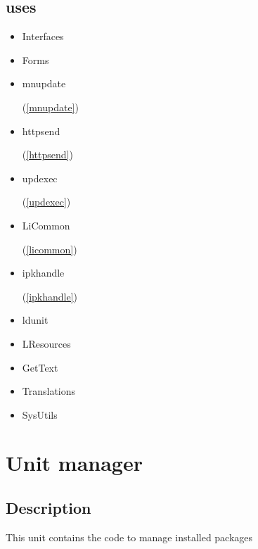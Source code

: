 \documentclass{report}
\begin{document}
\section{uses}
\begin{itemize}
\item \begin{ttfamily}Interfaces\end{ttfamily}\item \begin{ttfamily}Forms\end{ttfamily}\item \begin{ttfamily}mnupdate\end{ttfamily}(\ref{mnupdate})\item \begin{ttfamily}httpsend\end{ttfamily}(\ref{httpsend})\item \begin{ttfamily}updexec\end{ttfamily}(\ref{updexec})\item \begin{ttfamily}LiCommon\end{ttfamily}(\ref{licommon})\item \begin{ttfamily}ipkhandle\end{ttfamily}(\ref{ipkhandle})\item \begin{ttfamily}ldunit\end{ttfamily}\item \begin{ttfamily}LResources\end{ttfamily}\item \begin{ttfamily}GetText\end{ttfamily}\item \begin{ttfamily}Translations\end{ttfamily}\item \begin{ttfamily}SysUtils\end{ttfamily}\end{itemize}
\chapter{Unit manager}
\label{manager}
\section{Description}
This unit contains the code to manage installed packages
\end{document}
